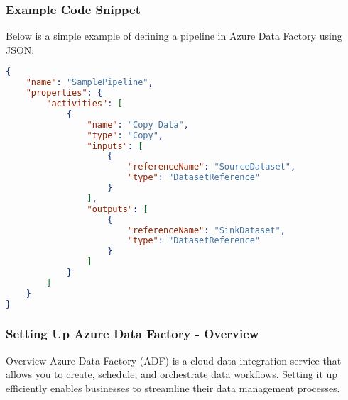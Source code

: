 \documentclass[aspectratio=169]{beamer}
\begin{document}
\begin{frame}[fragile]
    \frametitle{Example Code Snippet}
    Below is a simple example of defining a pipeline in Azure Data Factory using JSON:
    \begin{lstlisting}[language=json]
{
    "name": "SamplePipeline",
    "properties": {
        "activities": [
            {
                "name": "Copy Data",
                "type": "Copy",
                "inputs": [
                    {
                        "referenceName": "SourceDataset",
                        "type": "DatasetReference"
                    }
                ],
                "outputs": [
                    {
                        "referenceName": "SinkDataset",
                        "type": "DatasetReference"
                    }
                ]
            }
        ]
    }
}
    \end{lstlisting}
\end{frame}

\begin{frame}[fragile]
    \frametitle{Setting Up Azure Data Factory - Overview}
    \begin{block}{Overview}
        Azure Data Factory (ADF) is a cloud data integration service that allows you to create, schedule, and orchestrate data workflows. 
        Setting it up efficiently enables businesses to streamline their data management processes.
    \end{block}
\end{frame}
\end{document}
